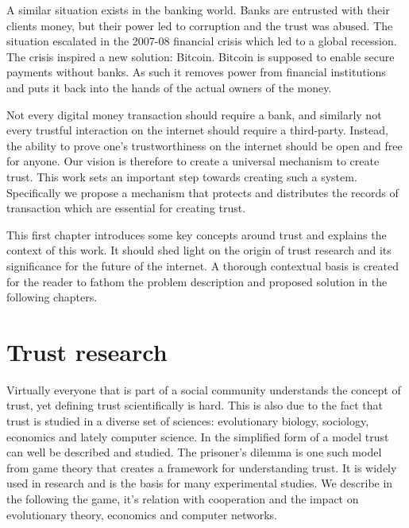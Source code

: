A similar situation exists in the banking world. Banks are entrusted with their clients money, but 
their power led to corruption and the trust was abused. The situation escalated in the 2007-08 
financial crisis which led to a global recession. The crisis inspired a new solution: Bitcoin. Bitcoin
is supposed to enable secure payments without banks. As such it removes power from financial 
institutions and puts it back into the hands of the actual owners of the money. 

Not every digital money transaction should require a bank, and similarly not every trustful
interaction on the internet should require a third-party. Instead, the ability to prove one's trustworthiness
on the internet should be open and free for anyone. Our vision is therefore to create a universal
mechanism to create trust. This work sets an important 
step towards creating such a system. Specifically we propose a mechanism that protects and 
distributes the records of transaction which are essential for creating trust. 

This first chapter introduces some key concepts around trust and explains the context of this work.
It should shed light on the origin of trust research and its significance for the future of the 
internet. A thorough contextual basis is created for the reader to fathom the problem description
and proposed solution in the following chapters.

\section{Trust research}
Virtually everyone that is part of a social community understands the concept of trust, yet defining
trust scientifically is hard. This is also due to the fact that trust is studied in a diverse set 
of sciences: evolutionary biology, sociology, economics and lately computer science. In the simplified
form of a model trust can well be described and studied. The prisoner's 
dilemma\cite{chammah1965prisoner} is one such model from game theory that creates a framework for 
understanding trust. It is widely used in research and is the basis for many experimental studies.
We describe in the following the game, it's relation with cooperation and the impact on evolutionary
theory, economics and computer networks.

